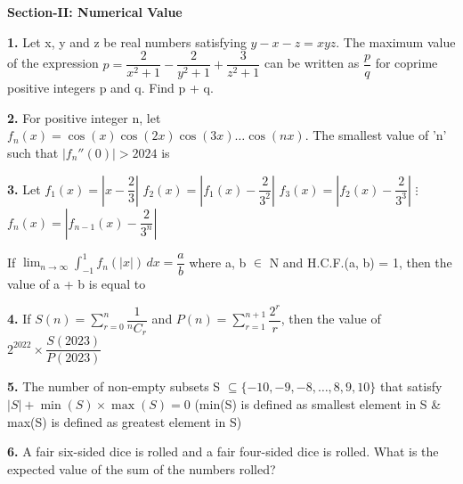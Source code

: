 \documentclass[10pt,twocolumn]{extarticle}
\newcommand{\subsectionhdr}[1]{\par\vspace{3pt}\noindent\textbf{#1}\par\vspace{2pt}}
\begin{document}
\subsectionhdr{Section-II: Numerical Value}

\textbf{1.} Let x, y and z be real numbers satisfying $y-x-z=xyz$. The maximum value of the expression $p=\dfrac{2}{x^2+1}-\dfrac{2}{y^2+1}+\dfrac{3}{z^2+1}$ can be written as $\dfrac pq$ for coprime positive integers p and q. Find p + q.

\textbf{2.} For positive integer n, let $f_n(x)=\cos(x)\cos(2x)\cos(3x)\ldots\cos(nx)$. The smallest value of 'n' such that $|f_n''(0)|>2024$ is

\textbf{3.} Let $f_1(x)=\left|x-\dfrac23\right|$
$f_2(x)=\left|f_1(x)-\dfrac2{3^2}\right|$
$f_3(x)=\left|f_2(x)-\dfrac2{3^3}\right|$
$\vdots$
$f_n(x)=\left|f_{n-1}(x)-\dfrac2{3^n}\right|$

If $\displaystyle\lim_{n\to\infty}\int_{-1}^1 f_n(|x|)\,dx=\dfrac ab$ where a, b $\in$ N and H.C.F.(a, b) = 1, then the value of a + b is equal to

\textbf{4.} If $\displaystyle S(n)=\sum_{r=0}^n\dfrac1{{}^nC_r}$ and $\displaystyle P(n)=\sum_{r=1}^{n+1}\dfrac{2^r}r$, then the value of $2^{2022}\times\dfrac{S(2023)}{P(2023)}$

\textbf{5.} The number of non-empty subsets S $\subseteq\{-10,-9,-8,\ldots,8,9,10\}$ that satisfy $|S|+\min(S)\times\max(S)=0$
(min(S) is defined as smallest element in S \& max(S) is defined as greatest element in S)

\textbf{6.} A fair six-sided dice is rolled and a fair four-sided dice is rolled. What is the expected value of the sum of the numbers rolled?
\end{document}
